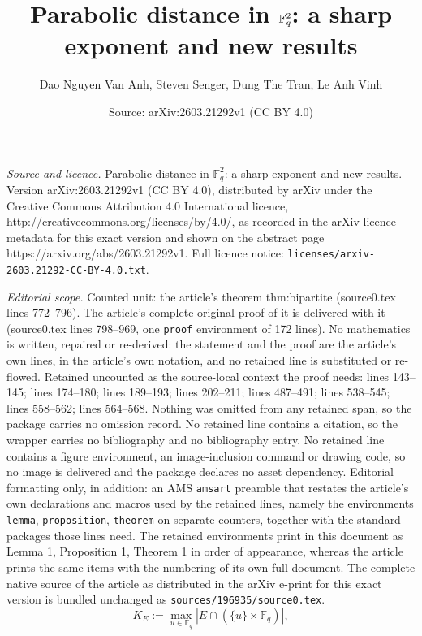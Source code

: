 \documentclass[10pt,a4paper]{amsart}
\title{Parabolic distance in $\F_q^2$: a sharp exponent and new results}
\author{Dao Nguyen Van Anh, Steven Senger, Dung The Tran, Le Anh Vinh}
\date{Source: arXiv:2603.21292v1 (CC BY 4.0)}
\newcommand{\F}{\mathbb{F}}
\newcommand{\abs}[1]{\left|#1\right|}
\begin{document}
\maketitle

\noindent\emph{Source and licence.} Parabolic distance in $\F_q^2$: a sharp exponent and new results. Version arXiv:2603.21292v1 (CC BY 4.0), distributed by arXiv under the Creative Commons Attribution 4.0 International licence, http://creativecommons.org/licenses/by/4.0/, as recorded in the arXiv licence metadata for this exact version and shown on the abstract page https://arxiv.org/abs/2603.21292v1. Full licence notice: \texttt{licenses/arxiv-2603.21292-CC-BY-4.0.txt}.\par\smallskip

\noindent\textit{Editorial scope.} Counted unit: the article's theorem thm:bipartite (source0.tex lines 772--796). The article's complete original proof of it is delivered with it (source0.tex lines 798--969, one \texttt{proof} environment of 172 lines). No mathematics is written, repaired or re-derived: the statement and the proof are the article's own lines, in the article's own notation, and no retained line is substituted or re-flowed.  Retained uncounted as the source-local context the proof needs: lines 143--145; lines 174--180; lines 189--193; lines 202--211; lines 487--491; lines 538--545; lines 558--562; lines 564--568.  Nothing was omitted from any retained span, so the package carries no omission record.  No retained line contains a citation, so the wrapper carries no bibliography and no bibliography entry.  No retained line contains a figure environment, an image-inclusion command or drawing code, so no image is delivered and the package declares no asset dependency.  Editorial formatting only, in addition: an AMS \texttt{amsart} preamble that restates the article's own declarations and macros used by the retained lines, namely the environments \texttt{lemma}, \texttt{proposition}, \texttt{theorem} on separate counters, together with the standard packages those lines need.  The retained environments print in this document as Lemma 1, Proposition 1, Theorem 1 in order of appearance, whereas the article prints the same items with the numbering of its own full document.  The complete native source of the article as distributed in the arXiv e-print for this exact version is bundled unchanged as \texttt{sources/196935/source0.tex}.
\begin{equation}\label{eq:def-K}
K_E:=\max_{u\in \F_q}\abs{E\cap (\{u\}\times \F_q)},
\end{equation}
\end{document}
